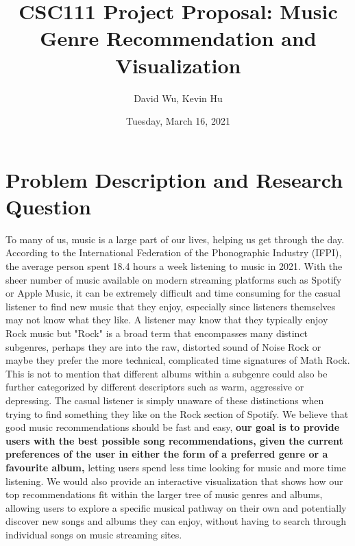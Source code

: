 \documentclass[fontsize=11pt]{article}
\title{CSC111 Project Proposal: Music Genre Recommendation and Visualization}
\author{David Wu, Kevin Hu}
\date{Tuesday, March 16, 2021}
\begin{document}
\maketitle

\section*{Problem Description and Research Question}

To many of us, music is a large part of our lives, helping us get through the day. According to the International Federation of the Phonographic Industry (IFPI), the average person spent 18.4 hours a week listening to music in 2021. With the sheer number of music available on modern streaming platforms such as Spotify or Apple Music, it can be extremely difficult and time consuming for the casual listener to find new music that they enjoy, especially since listeners themselves may not know what they like. A listener may know that they typically enjoy Rock music but "Rock" is a broad term that encompasses many distinct subgenres, perhaps they are into the raw, distorted sound of Noise Rock or maybe they prefer the more technical, complicated time signatures of Math Rock. This is not to mention that different albums within a subgenre could also be further categorized by different descriptors such as warm, aggressive or depressing. The casual listener is simply unaware of these distinctions when trying to find something they like on the Rock section of Spotify. We believe that good music recommendations should be fast and easy, \textbf{our goal is to provide users with the best possible song recommendations, given the current preferences of the user in either the form of a preferred genre or a favourite album,} letting users spend less time looking for music and more time listening. We would also provide an interactive visualization that shows how our top recommendations fit within the larger tree of music genres and albums, allowing users to explore a specific musical pathway on their own and potentially discover new songs and albums they can enjoy, without having to search through individual songs on music streaming sites.
\end{document}
